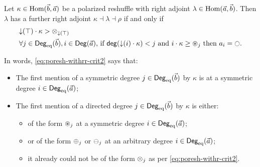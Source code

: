 \documentclass[a4paper]{memoir}
\begin{document}
\begin{theorem} \label{thm:poresh-withrr}
	Let $\kappa \in {\mathrm{Hom}}(\vec b, \vec a)$ be a polarized reshuffle with right adjoint $\lambda \in {\mathrm{Hom}}(\vec a, \vec b)$.
	Then $\lambda$ has a further right adjoint $\kappa \dashv \lambda \dashv \rho$ if and only if
	\begin{align}
		&\predeg(\top) \cdot \kappa > \mixpol_{\predeg(\top)} \label{eq:poresh-withrr-crit1} \\
		&\text{$\forall j \in \Degeq(\vec b), i \in \Deg(\vec a)$, if $\getdeg(\predeg(i) \cdot \kappa) < j$ and $i \cdot \kappa \geq \isopol_j$ then $a_i = \npolar$.} \label{eq:poresh-withrr-crit2}
	\end{align}
\end{theorem}
In words, \cref{eq:poresh-withrr-crit2} says that:
\begin{itemize}
	\item The first mention of a symmetric degree $j \in {\mathsf{Deg}_{\mathrm{eq}}}(\vec b)$ by $\kappa$ is at a symmetric degree $i \in {\mathsf{Deg}_{\mathrm{eq}}}(\vec a)$;
	\item The first mention of a directed degree $j \in {\mathsf{Deg}_{\mathrm{eq}}}(\vec b)$ by $\kappa$ is either:
	\begin{itemize}
		\item of the form ${\oast}_j$ at a symmetric degree $i \in {\mathsf{Deg}_{\mathrm{eq}}}(\vec a)$;
		\item or of the form ${\oplus}_j$ or ${\ominus}_j$ at an arbitrary degree $i \in {\mathsf{Deg}_{\mathrm{eq}}}(\vec a)$;
		\item it already could not be of the form ${\otimes}_j$ as per \cref{eq:poresh-withr-crit2}.
	\end{itemize}
\end{itemize}
\end{document}
